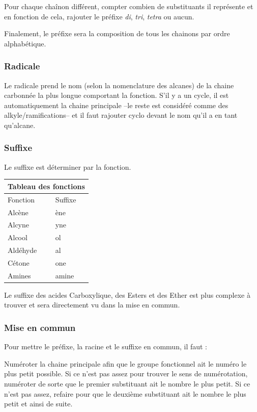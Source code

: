 \documentclass[a4paper]{article}
\begin{document}
    Pour chaque chaînon différent, compter combien de substituants il
    représente et en fonction de cela, rajouter le préfixe \textit{di},
    \textit{tri}, \textit{tetra} ou
    aucun.

    Finalement, le préfixe sera la composition de tous les chainons par ordre
    alphabétique.

    \subsubsection{Radicale}
    Le radicale prend le nom (selon la nomenclature des alcanes) de la chaine
    carbonnée la plus longue comportant la fonction. S'il y a un cycle, il est
    automatiquement la chaine principale --le reste est considéré comme des
    alkyle/ramifications-- et il faut rajouter cyclo devant le nom qu'il a en
    tant qu'alcane.

    \subsubsection{Suffixe}
    Le suffixe est déterminer par la fonction.

    \begin{tabular}{ |p{4.5cm}|p{4.5cm}|}
        \hline
        \multicolumn{2}{|c|}{Tableau des fonctions} \\
        \hline
        Fonction & Suffixe\\
        \hline
        Alcène      & ène \\
        Alcyne      & yne \\
        Alcool      & ol \\
        Aldéhyde    & al \\
        Cétone      & one \\
        Amines       & amine \\
    \hline
    \end{tabular}

    Le suffixe des acides Carboxylique, des Esters et des Ether est plus
    complexe à trouver et sera directement vu dans la mise en commun.

    \subsubsection{Mise en commun}
    Pour mettre le préfixe, la racine et le suffixe en commun, il faut :

    Numéroter la chaine principale afin que le groupe fonctionnel ait le numéro
    le plus petit possible. Si ce n'est pas assez pour trouver le sens de
    numérotation, numéroter de sorte que le premier substituant ait le nombre
    le plus petit. Si ce n'est pas assez, refaire pour que le deuxième
    substituant ait le nombre le plus petit et ainsi de suite.
\end{document}

